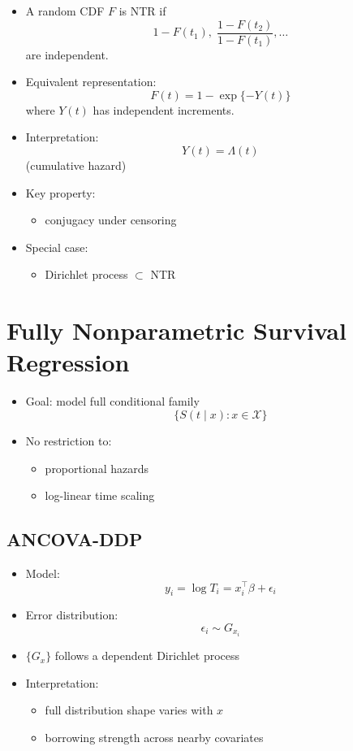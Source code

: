 \documentclass[12pt,oneside]{book}
\numberwithin{equation}{section}
\theoremstyle{definition}
\theoremstyle{plain}
\theoremstyle{remark}
\begin{document}
\begin{itemize}
\item A random CDF $F$ is NTR if
\[
1 - F(t_1), \;
\frac{1 - F(t_2)}{1 - F(t_1)}, \dots
\]
are independent.

\item Equivalent representation:
\[
F(t) = 1 - \exp\{-Y(t)\}
\]
where $Y(t)$ has independent increments.

\item Interpretation:
\[
Y(t) = \Lambda(t)
\]
(cumulative hazard)

\item Key property:
\begin{itemize}
\item conjugacy under censoring
\end{itemize}

\item Special case:
\begin{itemize}
\item Dirichlet process $\subset$ NTR
\end{itemize}
\end{itemize}

\section{Fully Nonparametric Survival Regression}

\begin{itemize}
\item Goal: model full conditional family
\[
\{ S(t \mid x) : x \in \mathcal{X} \}
\]

\item No restriction to:
\begin{itemize}
\item proportional hazards
\item log-linear time scaling
\end{itemize}
\end{itemize}

\subsection{ANCOVA-DDP}

\begin{itemize}
\item Model:
\[
y_i = \log T_i = x_i^\top \beta + \epsilon_i
\]

\item Error distribution:
\[
\epsilon_i \sim G_{x_i}
\]

\item $\{G_x\}$ follows a dependent Dirichlet process

\item Interpretation:
\begin{itemize}
\item full distribution shape varies with $x$
\item borrowing strength across nearby covariates
\end{itemize}
\end{itemize}
\end{document}
